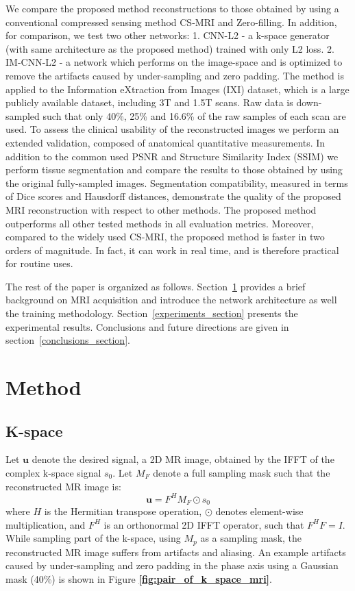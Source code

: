 \documentclass[review]{elsarticle}
\begin{document}
We compare the proposed method reconstructions to those obtained by using a conventional compressed sensing method CS-MRI \cite{lustig2007sparse} and Zero-filling. In addition, for comparison, we test two other networks: 1. CNN-L2 - a k-space generator (with same architecture as the proposed method) trained with only L2 loss. 2. IM-CNN-L2 - a network which performs on the image-space and is optimized to remove the artifacts caused by under-sampling and zero padding.
The method is applied to the Information eXtraction from Images (IXI) dataset, which is a large publicly available dataset, including 3T and 1.5T scans. Raw data is down-sampled such that only 40\%, 25\% and 16.6\% of the raw samples of each scan are used.
To assess the clinical usability of the reconstructed images we perform an extended validation, composed of anatomical quantitative measurements. In addition to the common used PSNR and Structure Similarity Index (SSIM) we perform tissue segmentation and compare the results to those obtained by using the original fully-sampled images.
Segmentation compatibility, measured in terms of Dice scores and Hausdorff distances, demonstrate the quality of the proposed MRI reconstruction with respect to other methods.
The proposed method outperforms all other tested methods in all evaluation metrics. Moreover, compared to the widely used CS-MRI, the proposed method is faster in two orders of magnitude. In fact, it can work in real time, and is therefore practical for routine uses.

The rest of the paper is organized as follows. Section~\ref{method_section} provides a brief background on MRI acquisition and introduce the network architecture as well the training methodology. Section~\ref{experiments_section} presents the experimental results. Conclusions and future directions are given in section~\ref{conclusions_section}.

\section{Method}\label{method_section}

\subsection{K-space}
Let $\bm{u}$ denote the desired signal, a 2D MR image, obtained by the IFFT of the complex k-space signal $s_{0}$. Let $M_{F}$ denote a full sampling mask such that the reconstructed MR image is: 
\begin{equation}
\bm{u}=F^{H}M_{F}\odot s_{0}
\end{equation} 
where $H$ is the Hermitian transpose operation, $\odot$ denotes element-wise multiplication, and $F^{H}$ is an orthonormal 2D IFFT operator, such that $F^{H}F=I$. 
While sampling part of the k-space, using $M_{p}$ as a sampling mask, the reconstructed MR image suffers from artifacts and aliasing. An example artifacts caused by under-sampling and zero padding in the phase axis using a Gaussian mask (40\%) is shown in Figure \textbf{\ref{fig:pair_of_k_space_mri}}.
\end{document}
